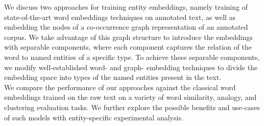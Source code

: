 We discuss two approaches for training entity embeddings, namely training of state-of-the-art word embeddings techniques on annotated text, as well as embedding the nodes of a co-occurrence graph representation of an annotated corpus. We take advantage of this graph structure to introduce the embeddings with separable components, where each component captures the relation of the word to named entities of a specific type. To achieve these separable components, we modify well-established word- and graph- embedding techniques to divide the embedding space into types of the named entities present in the text. \\
We compare the performance of our approaches against the classical word embeddings trained on the raw text on a variety of word similarity, analogy, and clustering evaluation tasks. We further explore the possible benefits and use-cases of such  models with entity-specific experimental analysis. 


